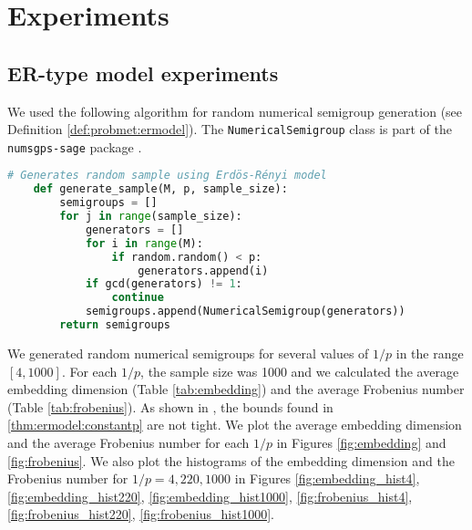 

\chapter{Experiments}\label{chap:experiments}

\section{ER-type model experiments}

We used the following algorithm for random numerical semigroup generation (see Definition \ref{def:probmet:ermodel}). The \verb|NumericalSemigroup| class is part of the \verb|numsgps-sage| package \cite{oneill2018}. 

\begin{lstlisting}[language=Python]
    # Generates random sample using Erdös-Rényi model 
    def generate_sample(M, p, sample_size):
        semigroups = []
        for j in range(sample_size):
            generators = []
            for i in range(M):
                if random.random() < p:
                    generators.append(i)
            if gcd(generators) != 1:
                continue
            semigroups.append(NumericalSemigroup(generators))
        return semigroups
\end{lstlisting}
We generated random numerical semigroups for several values of $1/p$ in the range $[4, 1000]$. For each $1/p$, the sample size was 1000 and we calculated the average embedding dimension (Table \ref{tab:embedding}) and the average Frobenius number (Table \ref{tab:frobenius}). As shown in \cite{de2018random}, the bounds found in \ref{thm:ermodel:constantp} are not tight. We plot the average embedding dimension and the average Frobenius number for each $1/p$ in Figures \ref{fig:embedding} and \ref{fig:frobenius}. We also plot the histograms of the embedding dimension and the Frobenius number for $1/p = 4, 220, 1000$ in Figures \ref{fig:embedding_hist4}, \ref{fig:embedding_hist220}, \ref{fig:embedding_hist1000}, \ref{fig:frobenius_hist4}, \ref{fig:frobenius_hist220}, \ref{fig:frobenius_hist1000}.

